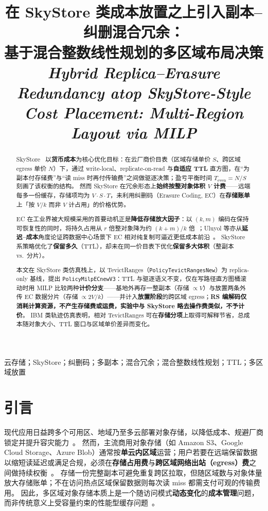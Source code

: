 \documentclass[conference]{IEEEtran}
\title{在 SkyStore 类成本放置之上引入副本--纠删混合冗余：\\基于混合整数线性规划的多区域布局决策\\[0.35em]
{\normalsize\itshape Hybrid Replica--Erasure Redundancy atop SkyStore-Style Cost Placement: Multi-Region Layout via MILP}}
\author{
\IEEEauthorblockN{作者姓名}
\IEEEauthorblockA{\textit{单位院系}\\
城市，国家\\
\texttt{email@example.edu}}
}
\begin{document}
\maketitle

\begin{abstract}
SkyStore~\cite{skystore2025} 以\textbf{货币成本}为核心优化目标：在云厂商价目表（区域存储单价 $S$、跨区域 egress 单价 $N$）下，通过 write-local、replicate-on-read 与\textbf{自适应 TTL} 直方图，在``为副本付存储费''与``读 miss 时再付传输费''之间做驱逐决策；盈亏平衡时间 $T_{\mathrm{even}}{=}N/S$ 刻画了该权衡的结构。
然而 SkyStore 在冗余形态上\textbf{始终按整对象体积 $V$ 计费}——远端每多一份缓存，存储项均为 $V{\cdot}S{\cdot}T$，未利用纠删码（Erasure Coding, EC）在\textbf{存储账单}上「按 $V/k$ 而非 $V$ 计占用」的价格优势。

EC 在工业界被大规模采用的首要动机正是\textbf{降低存储放大因子}：以 $(k,m)$ 编码在保持可恢复性的同时，将持久占用从 $r$ 倍整对象降为约 $(k{+}m)/k$ 倍~\cite{azure_ec2012,plank2013}；Uluyol 等亦从\textbf{延迟--成本}角度论证跨数据中心场景下 EC 相对纯复制可逼近更低成本前沿~\cite{uluyol2020}。
SkyStore 系策略优化了\textbf{保留多久}（TTL），却未在同一价目表下优化\textbf{保留多大体积}（整副本 vs.\ 分片）。

本文在 SkyStore 类仿真栈上，以 TevictRanges（\texttt{PolicyTevictRangesNew}）为 replica-only 基线，提出 \texttt{PolicyMilpECnewV3}：TTL 与驱逐语义不变，仅在写路径直方图桶滚动时用 MILP 比较两种\textbf{计价分支}——基地外再存一整副本（存储 $\propto V$）与放置两条外传 EC 数据分片（存储 $\propto 2V/k$）——并计入\textbf{放置阶段}的跨区域 egress；\textbf{RS 编解码仅消耗计算资源，不产生存储费或运费，实验中与 SkyStore 略去操作费类似，不予计价}。
IBM 类轨迹仿真表明，相对 TevictRanges 可在\textbf{存储分项}上取得可解释节省，总成本随对象大小、TTL 窗口与区域单价差异而变化。
\end{abstract}

\begin{IEEEkeywords}
云存储；SkyStore；纠删码；多副本；混合冗余；混合整数线性规划；TTL；多区域放置
\end{IEEEkeywords}

\section{引言}
\label{sec:intro}

现代应用日益跨多个可用区、地域乃至多云部署对象存储，以降低成本、规避厂商锁定并提升容灾能力~\cite{skystore2025}。
然而，主流商用对象存储（如 Amazon S3、Google Cloud Storage、Azure Blob）通常按\textbf{单云内区域}运营；用户若要在远端保留数据以缩短读延迟或满足合规，必须在\textbf{存储占用费}与\textbf{跨区域网络出站（egress）费}之间做持续权衡~\cite{skystore2025,spanstore2013}。
存储一份完整副本可避免重复跨区拉取，但随区域数与对象体量放大存储账单；不在访问热点区域保留数据则每次读 miss 都需支付可观的传输费用。
因此，多区域对象存储本质上是一个随访问模式\textbf{动态变化}的\textbf{成本管理}问题，而非传统意义上受容量约束的性能型缓存问题~\cite{skystore2025}。
\end{document}
